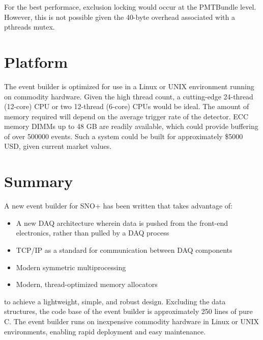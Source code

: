 \documentclass[11pt,twocolumn]{article}
\begin{document}
For the best performace, exclusion locking would occur at the PMTBundle level. However, this is not possible given the 40-byte overhead associated with a pthreads mutex.

\section{Platform}
The event builder is optimized for use in a Linux or UNIX environment running on commodity hardware. Given the high thread count, a cutting-edge 24-thread (12-core) CPU or two 12-thread (6-core) CPUs would be ideal. The amount of memory required will depend on the average trigger rate of the detector. ECC memory DIMMs up to 48 GB are readily available, which could provide buffering of over 500000 events. Such a system could be built for approximately \$5000 USD, given current market values.

\section{Summary}
A new event builder for SNO+ has been written that takes advantage of:
\begin{itemize}
\item A new DAQ architecture wherein data is pushed from the front-end electronics, rather than pulled by a DAQ process
\item TCP/IP as a standard for communication between DAQ components
\item Modern symmetric multiprocessing
\item Modern, thread-optimized memory allocators
\end{itemize}

to achieve a lightweight, simple, and robust design. Excluding the data structures, the code base of the event builder is approximately 250 lines of pure C. The event builder runs on inexpensive commodity hardware in Linux or UNIX environments, enabling rapid deployment and easy maintenance.
\end{document}
